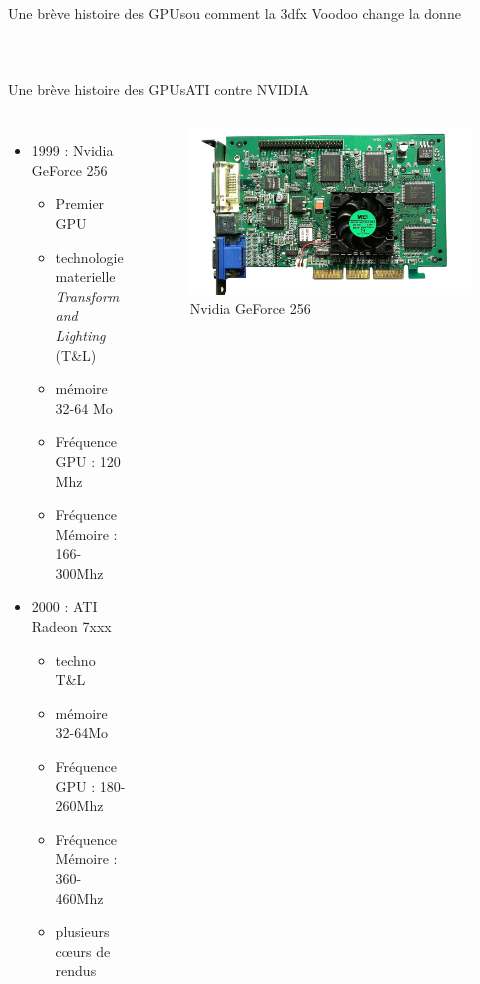 \documentclass[11pt,mathserif]{beamer}
\begin{document}
\begin{frame}{Une brève histoire des GPUs}{ou comment la 3dfx Voodoo change la donne}
\begin{columns}[t]
\begin{figure}[htbp]
    \end{figure}
  \end{columns}
\end{frame}

\begin{frame}{Une brève histoire des GPUs}{ATI contre NVIDIA}
  \begin{columns}[t]
    \column{7cm}
    \begin{itemize}[<+->]
      \item 1999 : Nvidia GeForce 256
        \begin{itemize}
         \item Premier GPU
         \item technologie materielle {\em Transform and Lighting}\/ (T\&L)
         \item mémoire 32-64 Mo
         \item Fréquence GPU : 120 Mhz
         \item Fréquence Mémoire : 166-300Mhz
         \end{itemize}
      \item 2000 : ATI Radeon 7xxx
        \begin{itemize}
          \item techno T\&L
          \item mémoire 32-64Mo
          \item Fréquence GPU : 180-260Mhz
          \item Fréquence Mémoire : 360-460Mhz
          \item plusieurs cœurs de rendus
         \end{itemize}
    \end{itemize} 
    \column{5cm}
\begin{figure}[htbp]
  \includegraphics[width=0.7\linewidth]{fig/geforce256.jpg}
      \caption{\tiny Nvidia  GeForce 256}

\end{figure}
\end{columns}
\end{frame}
\end{document}
